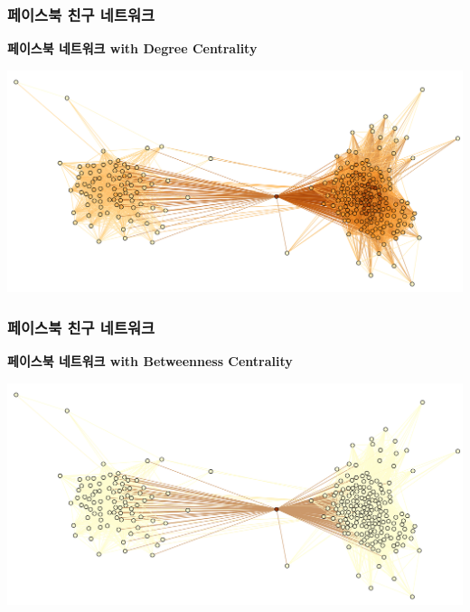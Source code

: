 \documentclass{beamer}
\begin{document}
\begin{frame}
\frametitle{페이스북 친구 네트워크}
\textbf{페이스북 네트워크 with Degree Centrality}
\begin{center}
\includegraphics[scale=0.26]{facebook_1.png}
\end{center}
\end{frame}

\begin{frame}
\frametitle{페이스북 친구 네트워크}
\textbf{페이스북 네트워크 with Betweenness Centrality}
\begin{center}
\includegraphics[scale=0.26]{facebook_2.png}
\end{center}
\end{frame}

\end{document}
